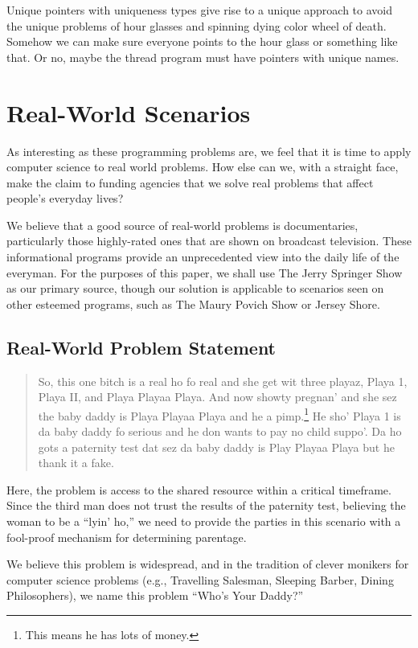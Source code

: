 \documentclass[10pt,twocolumn,letterpaper]{article}
\begin{document}
Unique pointers with uniqueness types give rise to a unique approach to avoid the unique problems of hour glasses and spinning dying color wheel of death. Somehow we can make sure everyone points to the hour glass or something like that. Or no, maybe the thread program must have pointers with unique names.


\section{Real-World Scenarios}
As interesting as these programming problems are, we feel that it is time to apply computer science to real world problems. How else can we, with a straight face, make the claim to funding agencies that we solve real problems that affect people's everyday lives?

We believe that a good source of real-world problems is documentaries, particularly those highly-rated ones that are shown on broadcast television. These informational programs provide an unprecedented view into the daily life of the everyman. For the purposes of this paper, we shall use The Jerry Springer Show as our primary source, though our solution is applicable to scenarios seen on other esteemed  programs, such as The Maury Povich Show or Jersey Shore.

\subsection{Real-World Problem Statement}

\begin{quote}
So, this one bitch is a real ho fo real and she get wit three playaz, Playa 1, Playa II, and Playa Playaa Playa. And now showty pregnan' and she sez the baby daddy is Playa Playaa Playa and he a pimp.\footnote{This means he has lots of money.} He sho' Playa 1 is da baby daddy fo serious and he don wants to pay no child suppo'. Da ho gots a paternity test dat sez da baby daddy is Play Playaa Playa but he thank it a fake.
\end{quote}

Here, the problem is access to the shared resource within a critical timeframe. Since the third man does not trust the results of the paternity test, believing the woman to be a ``lyin' ho,'' we need to provide the parties in this scenario with a fool-proof mechanism for determining parentage.

We believe this problem is widespread, and in the tradition of clever monikers for computer science problems (e.g., Travelling Salesman, Sleeping Barber, Dining Philosophers), we name this problem ``Who's Your Daddy?''
\end{document}
